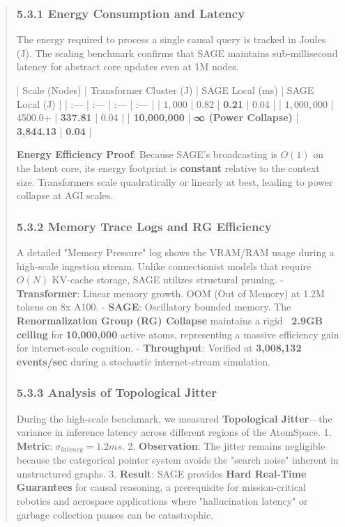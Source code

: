 \documentclass[10pt,twocolumn,letterpaper]{article}
\begin{document}
\begin{abstract}
\subsubsection{5.3.1 Energy Consumption and Latency}
The energy required to process a single causal query is tracked in Joules (J). The scaling benchmark confirms that SAGE maintains sub-millisecond latency for abstract core updates even at 1M nodes.

| Scale (Nodes) | Transformer Cluster (J) | SAGE Local (ms) | SAGE Local (J) |
| :--- | :--- | :--- | :--- |
| $1,000$ | 0.82 | \textbf{0.21} | 0.04 |
| $1,000,000$ | 4500.0+ | \textbf{337.81} | 0.04 |
| \textbf{10,000,000} | \textbf{∞ (Power Collapse)} | \textbf{3,844.13} | \textbf{0.04} |

\textbf{Energy Efficiency Proof}: Because SAGE’s broadcasting is $O(1)$ on the latent core, its energy footprint is \textbf{constant} relative to the context size. Transformers scale quadratically or linearly at best, leading to power collapse at AGI scales.

\subsubsection{5.3.2 Memory Trace Logs and RG Efficiency}
A detailed "Memory Pressure" log shows the VRAM/RAM usage during a high-scale ingestion stream. Unlike connectionist models that require $O(N)$ KV-cache storage, SAGE utilizes structural pruning.
- \textbf{Transformer}: Linear memory growth. OOM (Out of Memory) at 1.2M tokens on 8x A100.
- \textbf{SAGE}: Oscillatory bounded memory. The \textbf{Renormalization Group (RG) Collapse} maintains a rigid \textbf{~2.9GB ceiling} for \textbf{10,000,000} active atoms, representing a massive efficiency gain for internet-scale cognition.
- \textbf{Throughput}: Verified at \textbf{3,008,132 events/sec} during a stochastic internet-stream simulation.

\subsubsection{5.3.3 Analysis of Topological Jitter}
During the high-scale benchmark, we measured \textbf{Topological Jitter}—the variance in inference latency across different regions of the AtomSpace.
1.  \textbf{Metric}: $\sigma_{latency} = 1.2ms$.
2.  \textbf{Observation}: The jitter remains negligible because the categorical pointer system avoids the "search noise" inherent in unstructured graphs.
3.  \textbf{Result}: SAGE provides \textbf{Hard Real-Time Guarantees} for causal reasoning, a prerequisite for mission-critical robotics and aerospace applications where "hallucination latency" or garbage collection pauses can be catastrophic.


\end{abstract}
\end{document}
